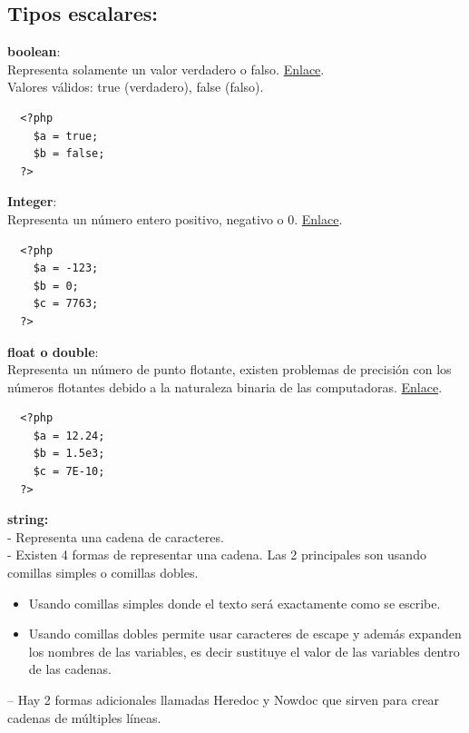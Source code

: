 \documentclass{article}
\begin{document}
\subsection*{Tipos escalares:}%
\textbf{boolean}:\\
Representa solamente un valor verdadero o falso.
\href{http://php.net/manual/es/language.types.boolean.php}{Enlace}.\\
Valores válidos: true (verdadero), false (falso).

\begin{verbatim}
  <?php
    $a = true;
    $b = false;
  ?>
\end{verbatim}

\textbf{Integer}:\\
Representa un número entero positivo, negativo o 0.
\href{http://php.net/manual/es/language.types.integer.php}{Enlace}.\\

\begin{verbatim}
  <?php
    $a = -123;
    $b = 0;
    $c = 7763;
  ?>
\end{verbatim}

\textbf{float o double}:\\
Representa un número de punto flotante, existen problemas de precisión con los
números flotantes debido a la naturaleza binaria de las computadoras.
\href{http://php.net/manual/es/language.types.float.php}{Enlace}.\\

\begin{verbatim}
  <?php
    $a = 12.24; 
    $b = 1.5e3; 
    $c = 7E-10;
  ?> 
\end{verbatim}

\textbf{string:}\\
- Representa una cadena de caracteres.\\
- Existen 4 formas de representar una cadena. Las 2 principales son usando
comillas simples o comillas dobles.\\
\begin{itemize}
  \item Usando comillas simples donde el texto será exactamente como se escribe.
  \item Usando comillas dobles permite usar caracteres de escape y además
    expanden los nombres de las variables, es decir sustituye el valor de las
    variables dentro de las cadenas.
\end{itemize}
– Hay 2 formas adicionales llamadas Heredoc y Nowdoc que sirven para crear
cadenas de múltiples líneas.\\
\end{document}
